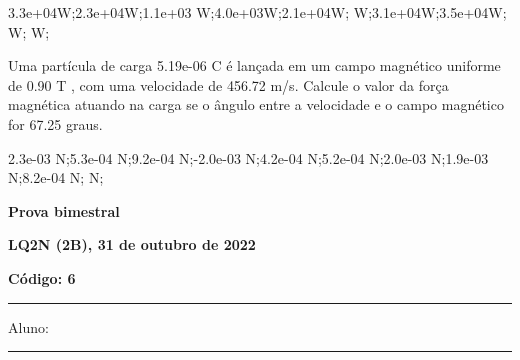 \documentclass[12pt, addpoints]{exam}
\begin{document}
\begin{questions}
\begin{multicols*}{2}
\begin{oneparchoices}
\choice 3.3e+04W;\choice 2.3e+04W;\choice 1.1e+03 W;\choice 4.0e+03W;\choice 2.1e+04W; W;\choice 3.1e+04W;\choice 3.5e+04W; W; W;\end{oneparchoices}
\question[20] Uma partícula de carga 5.19e-06 C é lançada em um campo magnético uniforme de    0.90 T , com uma velocidade de 456.72 m/s. Calcule o valor da força magnética atuando na carga se o ângulo entre a velocidade e o campo magnético for   67.25 graus.

\begin{oneparchoices}
\choice 2.3e-03 N;\choice 5.3e-04 N;\choice 9.2e-04 N;\choice -2.0e-03 N;\choice 4.2e-04 N;\choice 5.2e-04 N;\choice 2.0e-03 N;\choice 1.9e-03 N;\choice 8.2e-04 N; N;\end{oneparchoices}
\end{multicols*}
\end{questions}
\newpage
        \begin{minipage}[b]{0.75\linewidth}
            \begin{flushleft}
                {\bf \large Prova bimestral}
            \end{flushleft}
            \begin{flushleft}
                {\bf \large LQ2N (2B), 31 de outubro de 2022}
            \end{flushleft}
        \end{minipage}
        \begin{minipage}[b]{0.20\linewidth}
            \begin{flushright}
                {\bf \large Código: 6}
            \end{flushright}
        \end{minipage}
        \vspace{0.5cm} \hrule \vspace{0.5cm}
        \begin{minipage}{0.75\linewidth}
            Aluno:
        \end{minipage}
        \vspace{0.5cm} \hrule \vspace{0.5cm}
\end{document}
